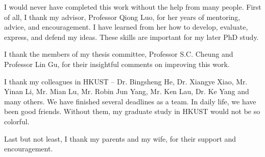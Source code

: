 \acknowledgments
I would never have completed this work without the help from many people. First of all, I thank my advisor, Professor Qiong Luo, for her years of mentoring, advice, and encouragement. I have learned from her how to develop, evaluate, express, and defend my ideas. These skills are important for my later PhD study. 

I thank the members of my thesis committee, Professor S.C. Cheung and Professor Lin Gu, for their insightful comments on improving this work. 

I thank my colleagues in HKUST -- Dr. Bingsheng He, Dr. Xiangye Xiao, Mr. Yinan Li, Mr. Mian Lu, Mr. Robin Jun Yang, Mr. Ken Lau, Dr. Ke Yang and many others. We have finished several deadlines as a team. In daily life, we have been good friends. Without them, my graduate study in HKUST would not be so colorful. 

Last but not least, I thank my parents and my wife, for their support and encouragement. 

\endacknowledgments
